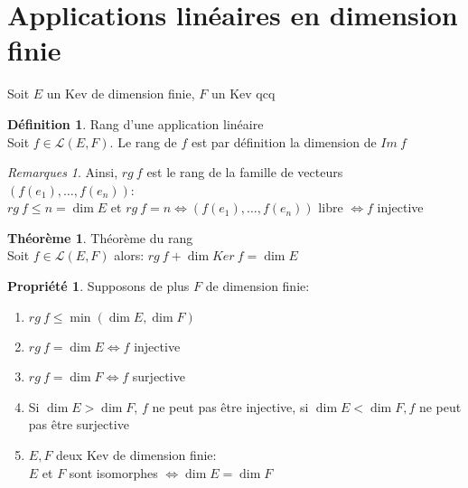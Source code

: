 \documentclass[fleqn]{article}
\theoremstyle{definition} \newtheorem*{defi}{D\'efinition}
\theoremstyle{definition} \newtheorem*{theo}{Th\'eor\`eme}
\theoremstyle{definition} \newtheorem*{coro}{Corollaire}
\theoremstyle{definition} \newtheorem*{nota}{Notation}
\theoremstyle{remark} \newtheorem*{rqs}{Remarques}
\theoremstyle{definition} \newtheorem*{prop}{Propri\'et\'e}
\begin{document}
\section{Applications lin\'eaires en dimension finie}
Soit $E$ un Kev de dimension finie, $F$ un Kev qcq
\begin{defi} Rang d'une application lin\'eaire \\
	Soit $f \in \mathscr{L}(E,F)$. Le rang de $f$ est par d\'efinition la dimension de $Im\ f$

	\begin{rqs}
		Ainsi, $rg\ f$ est le rang de la famille de vecteurs $(f(e_1), \hdots, f(e_n))$:\\
			$rg\ f \leq n = \dim E$ et $rg\ f = n \Leftrightarrow (f(e_1), \hdots, f(e_n))$ libre $\Leftrightarrow f$ injective
	\end{rqs}
\end{defi}

\begin{theo} Th\'eor\`eme du rang\\
	Soit $f \in \mathscr{L}(E,F)$ alors: $rg\ f + \dim Ker\ f = \dim E$
\end{theo}

\pagebreak
\begin{prop} Supposons de plus $F$ de dimension finie:
	\begin{enumerate}
		\item $rg\ f \leq \min(\dim E, \dim F)$
		\item $rg\ f = \dim E \Leftrightarrow f$ injective
		\item $rg\ f = \dim F \Leftrightarrow f$ surjective
		\item Si $\dim E > \dim F$, $f$ ne peut pas \^etre injective, si $\dim E < \dim F, f$ ne peut pas \^etre surjective
		\item $E,F$ deux Kev de dimension finie: \\ $E$ et $F$ sont isomorphes $\Leftrightarrow \dim E = \dim F$
	\end{enumerate}
\end{prop}
\end{document}
